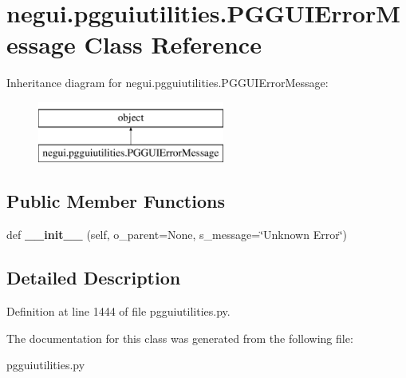 \hypertarget{classnegui_1_1pgguiutilities_1_1PGGUIErrorMessage}{}\section{negui.\+pgguiutilities.\+P\+G\+G\+U\+I\+Error\+Message Class Reference}
\label{classnegui_1_1pgguiutilities_1_1PGGUIErrorMessage}
Inheritance diagram for negui.\+pgguiutilities.\+P\+G\+G\+U\+I\+Error\+Message\+:\begin{figure}[H]
\begin{center}
\leavevmode
\includegraphics[height=2.000000cm]{classnegui_1_1pgguiutilities_1_1PGGUIErrorMessage}
\end{center}
\end{figure}
\subsection*{Public Member Functions}
\begin{DoxyCompactItemize}
\item 
def {\bfseries \+\_\+\+\_\+init\+\_\+\+\_\+} (self, o\+\_\+parent=None, s\+\_\+message=\char`\"{}Unknown Error\char`\"{})\hypertarget{classnegui_1_1pgguiutilities_1_1PGGUIErrorMessage_a5fd71ce11d3769e9508fb7c1994213d3}{}\label{classnegui_1_1pgguiutilities_1_1PGGUIErrorMessage_a5fd71ce11d3769e9508fb7c1994213d3}

\end{DoxyCompactItemize}


\subsection{Detailed Description}


Definition at line 1444 of file pgguiutilities.\+py.



The documentation for this class was generated from the following file\+:\begin{DoxyCompactItemize}
\item 
pgguiutilities.\+py\end{DoxyCompactItemize}
